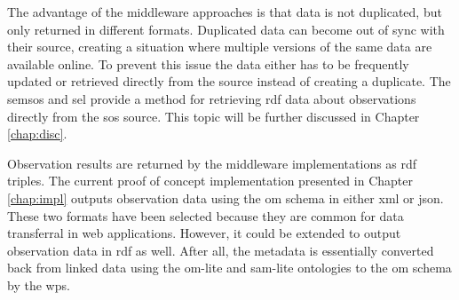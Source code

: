 The advantage of the middleware approaches is that data is not duplicated, but only returned in different formats. Duplicated data can become out of sync with their source, creating a situation where multiple versions of the same data are available online. To prevent this issue the data either has to be frequently updated or retrieved directly from the source instead of creating a duplicate. The \ac{semsos} and \ac{sel} provide a method for retrieving \ac{rdf} data about observations directly from the \ac{sos} source. This topic will be further discussed in Chapter \ref{chap:disc}.

Observation results are returned by the middleware implementations as \ac{rdf} triples. The current proof of concept implementation presented in Chapter \ref{chap:impl} outputs observation data using the \ac{om} schema in either \ac{xml} or \ac{json}. These two formats have been selected because they are common for data transferral in web applications. However, it could be extended to output observation data in \ac{rdf} as well. After all, the metadata is essentially converted back from linked data using the om-lite and sam-lite ontologies to the \ac{om} schema by the \ac{wps}.  
   
